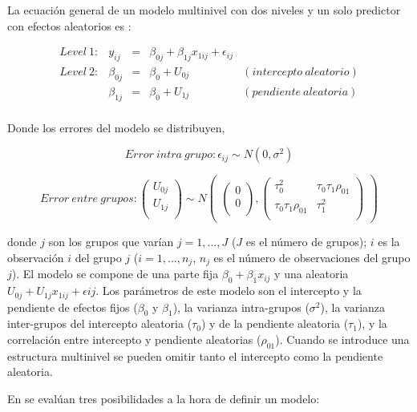 \documentclass[
  12pt,
  a4paper,
  extrafontsizes,
  onecolumn,
  openright]{memoir}
\begin{document}
La ecuación general de un modelo multinivel con dos niveles y un solo
predictor con efectos aleatorios es \autocite[ver][pp.~40]{chen2021}:

\[
\begin{aligned}
Level\ 1: & y_{ij}     & = & \beta_{0j} + \beta_{1j}x_{1ij} + \epsilon_{ij} \\
Level\ 2: & \beta_{0j} & = & \beta_{0} + U_{0j} & (intercepto\ aleatorio) \\
          & \beta_{1j} & = & \beta_{0} + U_{1j} & (pendiente\ aleatoria) \\
\end{aligned}
\]

Donde los errores del modelo se distribuyen,

\[
Error\ intra\ grupo:  \epsilon_{ij} \sim N(0, \sigma^2)
\]

\[
Error\ entre\ grupos: 
\begin{pmatrix}
     U_{0j} \\
     U_{1j} \\
\end{pmatrix} 
\sim
N
\begin{pmatrix}
\begin{pmatrix}
     0 \\
     0 \\
\end{pmatrix},
\begin{pmatrix}
     \tau_0^2 & \tau_0\tau_1\rho_{01} \\
     \tau_0\tau_1\rho_{01} &  \tau_1^2 \\
\end{pmatrix}
\end{pmatrix} 
\]

donde \(j\) son los grupos que varían \(j = 1,...,J\) (\(J\) es el
número de grupos); \(i\) es la observación \(i\) del grupo \(j\)
(\(i = 1,...,n_j\), \(n_j\) es el número de observaciones del grupo
\(j\)). El modelo se compone de una parte fija
\(\beta_0 + \beta_1 x_{ij}\) y una aleatoria
\(U_{0j} + U_{1j} x_{1ij} + \epsilon{ij}\). Los parámetros de este
modelo son el intercepto y la pendiente de efectos fijos (\(\beta_0\) y
\(\beta_1\)), la varianza intra-grupos (\(\sigma^2\)), la varianza
inter-grupos del intercepto aleatoria (\(\tau_0\)) y de la pendiente
aleatoria (\(\tau_1\)), y la correlación entre intercepto y pendiente
aleatorias (\(\rho_{01}\)). Cuando se introduce una estructura
multinivel se pueden omitir tanto el intercepto como la pendiente
aleatoria.

En \textcite{gelman2013} se evalúan tres posibilidades a la hora de
definir un modelo:
\end{document}
